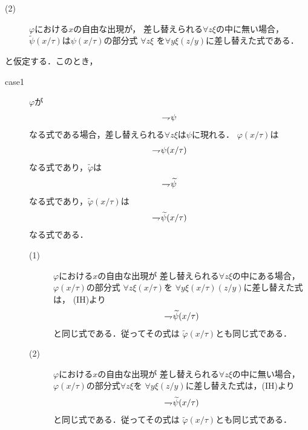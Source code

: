 \begin{metaprf}
\begin{description}
\begin{description}
\begin{description}
							\item[(2)] $\varphi$における$x$の自由な出現が，
								差し替えられる$\forall z \xi$の中に無い場合，
								$\widetilde{\psi}(x/\tau)$は$\psi(x/\tau)$の部分式
								$\forall z \xi$ を$\forall y \xi(z/y)$に差し替えた式である．
						\end{description}
				\end{description}
				と仮定する．このとき，
				\begin{description}
					\item[case1] $\varphi$が
						\begin{align}
							\rightharpoondown\hspace{-0.25em} \psi
						\end{align}
						なる式である場合，差し替えられる$\forall z \xi$は$\psi$に現れる．
						$\varphi(x/\tau)$は
						\begin{align}
							\rightharpoondown\hspace{-0.25em} \psi(x/\tau)
						\end{align}
						なる式であり，$\widetilde{\varphi}$は
						\begin{align}
							\rightharpoondown\hspace{-0.25em} \widetilde{\psi}
						\end{align}
						なる式であり，$\widetilde{\varphi}(x/\tau)$は
						\begin{align}
							\rightharpoondown\hspace{-0.25em} \widetilde{\psi}(x/\tau)
						\end{align}
						なる式である．
						\begin{description}
							\item[(1)] $\varphi$における$x$の自由な出現が
								差し替えられる$\forall z \xi$の中にある場合，
								$\varphi(x/\tau)$の部分式
								$\forall z \xi(x/\tau)$を
								$\forall y \xi(x/\tau)(z/y)$に差し替えた式は，
								(IH)より
								\begin{align}
									\rightharpoondown\hspace{-0.25em} \widetilde{\psi}(x/\tau)
								\end{align}
								と同じ式である．従ってその式は
								$\widetilde{\varphi}(x/\tau)$とも同じ式である．
								
							\item[(2)] $\varphi$における$x$の自由な出現が
								差し替えられる$\forall z \xi$の中に無い場合，
								$\varphi(x/\tau)$の部分式$\forall z \xi$を
								$\forall y \xi(z/y)$に差し替えた式は，(IH)より
								\begin{align}
									\rightharpoondown\hspace{-0.25em} \widetilde{\psi}(x/\tau)
								\end{align}
								と同じ式である．従ってその式は
								$\widetilde{\varphi}(x/\tau)$とも同じ式である．
						\end{description}
						

\end{description}
\end{description}
\end{metaprf}
